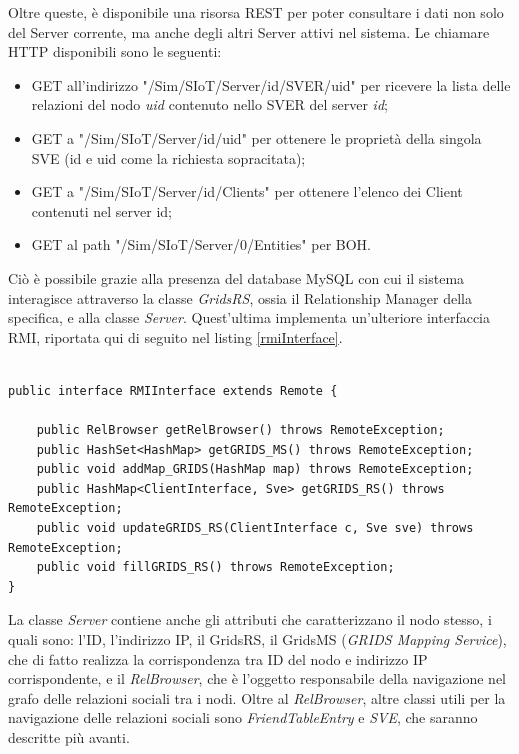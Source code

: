 Oltre queste, è disponibile una risorsa REST per poter consultare i dati non solo del Server corrente, ma anche degli altri Server attivi nel sistema. Le chiamare HTTP disponibili sono le seguenti:

\begin{itemize}
    \item GET all'indirizzo "/Sim/SIoT/Server/{id}/SVER/{uid}" per ricevere la lista delle relazioni del nodo \textit{uid} contenuto nello SVER del server \textit{id};
    \item GET a "/Sim/SIoT/Server/{id}/{uid}" per ottenere le proprietà della singola SVE (id e uid come la richiesta sopracitata);
    \item GET a "/Sim/SIoT/Server/{id}/Clients" per ottenere l'elenco dei Client contenuti nel server {id};
    \item GET al path "/Sim/SIoT/Server/0/Entities" per BOH. 
    
\end{itemize}

Ciò è possibile grazie alla presenza del database MySQL con cui il sistema interagisce attraverso la classe \textit{GridsRS}, ossia il Relationship Manager della specifica, e alla classe \textit{Server}. Quest'ultima implementa un'ulteriore interfaccia RMI, riportata qui di seguito nel listing \ref{rmiInterface}.

\begin{lstlisting}[caption={RMIInterface.java},label={rmiInterface},style={c}]

public interface RMIInterface extends Remote {

    public RelBrowser getRelBrowser() throws RemoteException;
    public HashSet<HashMap> getGRIDS_MS() throws RemoteException;
    public void addMap_GRIDS(HashMap map) throws RemoteException;
    public HashMap<ClientInterface, Sve> getGRIDS_RS() throws RemoteException;
    public void updateGRIDS_RS(ClientInterface c, Sve sve) throws RemoteException;
    public void fillGRIDS_RS() throws RemoteException;
}
\end{lstlisting}

La classe \textit{Server} contiene anche gli attributi che caratterizzano il nodo stesso, i quali sono: l'ID, l'indirizzo IP, il GridsRS, il GridsMS (\textit{GRIDS Mapping Service}), che di fatto realizza la corrispondenza tra ID del nodo e indirizzo IP corrispondente, e il \textit{RelBrowser}, che è l'oggetto responsabile della navigazione nel grafo delle relazioni sociali tra i nodi.
Oltre al \textit{RelBrowser}, altre classi utili per la navigazione delle relazioni sociali sono \textit{FriendTableEntry} e \textit{SVE}, che saranno descritte più avanti.

